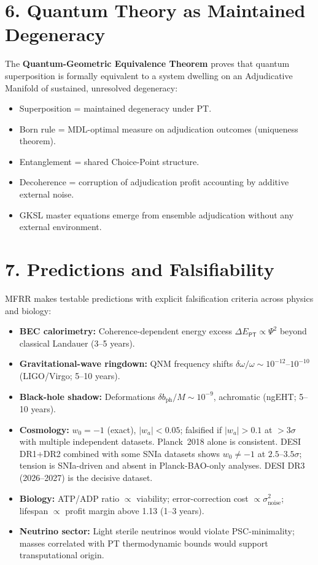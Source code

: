 \documentclass[11pt]{article}
\newcommand{\PT}{\ensuremath{{\mathsf{PT}}}}
\begin{document}
\section*{6. Quantum Theory as Maintained Degeneracy}

The \textbf{Quantum-Geometric Equivalence Theorem} proves that quantum superposition is formally
equivalent to a system dwelling on an Adjudicative Manifold of sustained, unresolved degeneracy:
\begin{itemize}
    \item Superposition = maintained degeneracy under PT.
    \item Born rule = MDL-optimal measure on adjudication outcomes (uniqueness theorem).
    \item Entanglement = shared Choice-Point structure.
    \item Decoherence = corruption of adjudication profit accounting by additive external noise.
    \item GKSL master equations emerge from ensemble adjudication without any external environment.
\end{itemize}

\section*{7. Predictions and Falsifiability}

MFRR makes testable predictions with explicit falsification criteria across physics and biology:

\begin{itemize}
    \item \textbf{BEC calorimetry:} Coherence-dependent energy excess $\Delta E_\PT \propto \Psi^2$
    beyond classical Landauer (3--5 years).
    \item \textbf{Gravitational-wave ringdown:} QNM frequency shifts
    $\delta\omega/\omega \sim 10^{-12}$--$10^{-10}$ (LIGO/Virgo; 5--10 years).
    \item \textbf{Black-hole shadow:} Deformations $\delta b_\mathrm{ph}/M \sim 10^{-9}$, achromatic
    (ngEHT; 5--10 years).
    \item \textbf{Cosmology:} $w_0 = -1$ (exact), $|w_a| < 0.05$;
    falsified if $|w_a| > 0.1$ at $> 3\sigma$ with multiple independent datasets.
    Planck~2018 alone is consistent. DESI DR1+DR2 combined with some SNIa datasets shows
    $w_0 \neq -1$ at $2.5$--$3.5\sigma$; tension is SNIa-driven and absent in
    Planck-BAO-only analyses. DESI DR3 (2026--2027) is the decisive dataset.
    \item \textbf{Biology:} ATP/ADP ratio $\propto$ viability; error-correction cost
    $\propto \sigma^2_\mathrm{noise}$; lifespan $\propto$ profit margin above 1.13 (1--3 years).
    \item \textbf{Neutrino sector:} Light sterile neutrinos would violate PSC-minimality;
    masses correlated with PT thermodynamic bounds would support transputational origin.
\end{itemize}
\end{document}
